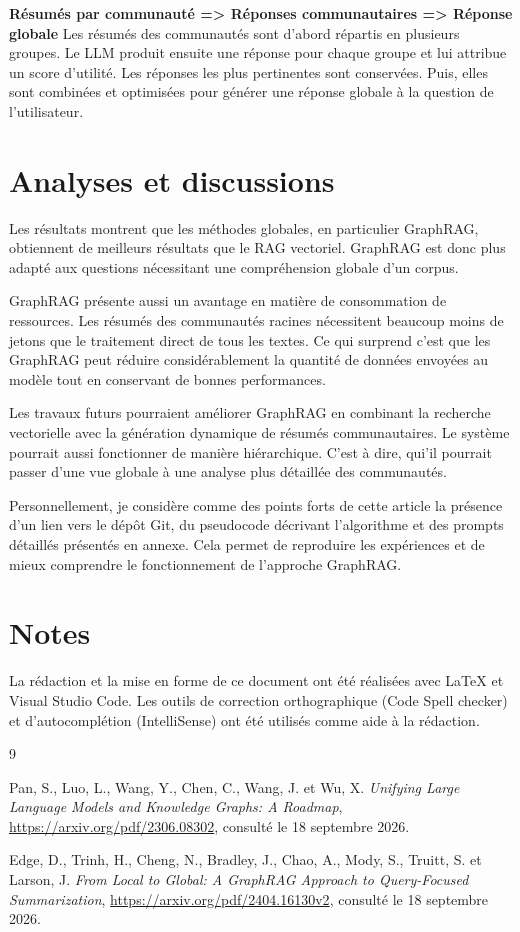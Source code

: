 \documentclass[12pt,a4paper]{report}
\begin{document}
\textbf{Résumés par communauté => Réponses communautaires => Réponse globale}
Les résumés des communautés sont d'abord répartis en plusieurs groupes. Le LLM produit ensuite une réponse 
pour chaque groupe et lui attribue un score d'utilité. Les réponses les plus pertinentes sont conservées. 
Puis, elles sont combinées et optimisées pour générer une réponse globale à la question de l'utilisateur.



\section{Analyses et discussions}
Les résultats montrent que les méthodes globales, en particulier GraphRAG, obtiennent de meilleurs résultats 
que le RAG vectoriel. GraphRAG est donc plus adapté aux questions nécessitant une compréhension globale d'un corpus.

GraphRAG présente aussi un avantage en matière de consommation de ressources. Les résumés des communautés 
racines nécessitent beaucoup moins de jetons que le traitement direct de tous les textes. Ce qui surprend 
c'est que les GraphRAG peut réduire considérablement la quantité de données envoyées au modèle tout en 
conservant de bonnes performances.

Les travaux futurs pourraient améliorer GraphRAG en combinant la recherche vectorielle avec la génération 
dynamique de résumés communautaires. Le système pourrait aussi fonctionner de manière hiérarchique. C'est à dire, 
qui'il pourrait passer d'une vue globale à une analyse plus détaillée des communautés.

Personnellement, je considère comme des points forts de cette article la présence d'un lien vers le dépôt Git, 
du pseudocode décrivant l'algorithme et des prompts détaillés présentés en annexe. Cela permet de reproduire les 
expériences et de mieux comprendre le fonctionnement de l'approche GraphRAG.

\section*{Notes}
La rédaction et la mise en forme de ce document ont été réalisées avec \LaTeX{} et 
Visual Studio Code. Les outils de correction orthographique (Code Spell checker) et d'autocomplétion 
(IntelliSense) ont été utilisés comme aide à la rédaction.


\begin{thebibliography}{9}

Pan, S., Luo, L., Wang, Y., Chen, C., Wang, J. et Wu, X.
\textit{Unifying Large Language Models and Knowledge Graphs: A Roadmap},
\url{https://arxiv.org/pdf/2306.08302},
consulté le 18 septembre 2026.

Edge, D., Trinh, H., Cheng, N., Bradley, J., Chao, A., Mody, S., Truitt, S. et Larson, J. 
\textit{From Local to Global: A GraphRAG Approach to Query-Focused Summarization},
\url{https://arxiv.org/pdf/2404.16130v2},
consulté le 18 septembre 2026.

\end{thebibliography}
\end{document}
